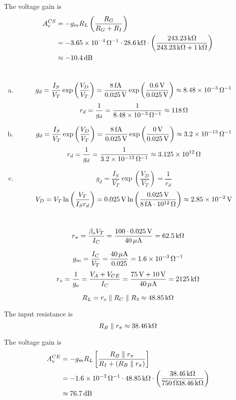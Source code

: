 \documentclass{article}
\newcommand{\unit}[1]{{\rm\,#1}}
\begin{document}
The voltage gain is
\begin{align*}
A_v^{CS}&=-g_mR_L\left(\frac{R_G}{R_G+R_I}\right)\\
&=-3.65\times10^{-4}\unit{\Omega^{-1}}\cdot28.6\unit{k\Omega}\cdot\left(\frac{243.23\unit{k\Omega}}{243.23\unit{k\Omega}+1\unit{k\Omega}}\right)\\
&\approx-10.4\unit{dB}
\end{align*}

\section{}
\begin{enumerate}[(a)]
\item $$g_d=\frac{I_S}{V_T}\exp\left(\frac{V_D}{V_T}\right)=\frac{8\unit{fA}}{0.025\unit{V}}\exp\left(\frac{0.6\unit{V}}{0.025\unit{V}}\right)\approx8.48\times10^{-3}\unit{\Omega^{-1}}$$
$$r_d=\frac{1}{g_d}=\frac{1}{8.48\times10^{-3}\unit{\Omega^{-1}}}\approx118\unit{\Omega}$$
\item $$g_d=\frac{I_S}{V_T}\exp\left(\frac{V_D}{V_T}\right)=\frac{8\unit{fA}}{0.025\unit{V}}\exp\left(\frac{0\unit{V}}{0.025\unit{V}}\right)\approx3.2\times10^{-13}\unit{\Omega^{-1}}$$
$$r_d=\frac{1}{g_d}=\frac{1}{3.2\times10^{-13}\unit{\Omega^{-1}}}\approx3.125\times10^{12}\unit{\Omega}$$
\item $$g_d=\frac{I_S}{V_T}\exp\left(\frac{V_D}{V_T}\right)=\frac{1}{r_d}$$
$$V_D=V_T\ln\left(\frac{V_T}{I_Sr_d}\right)=0.025\unit{V}\ln\left(\frac{0.025\unit{V}}{8\unit{fA}\cdot10^{12}\unit{\Omega}}\right)\approx2.85\times10^{-2}\unit{V}$$
\end{enumerate}

\section{}
$$r_\pi=\frac{\beta_oV_T}{I_C}=\frac{100\cdot0.025\unit{V}}{40\unit{\mu A}}=62.5\unit{k\Omega}$$

$$g_m=\frac{I_C}{V_T}=\frac{40\unit{\mu A}}{0.025}=1.6\times10^{-3}\unit{\Omega^{-1}}$$
$$r_o=\frac{1}{g_o}=\frac{V_A+V_{CE}}{I_C}=\frac{75\unit{V}+10\unit{V}}{40\unit{\mu A}}=2125\unit{k\Omega}$$

$$R_L=r_o\parallel R_C\parallel R_3\approx48.85\unit{k\Omega}$$

The input resistance is
$$R_B\parallel r_\pi\approx38.46\unit{k\Omega}$$

The voltage gain is
\begin{align*}
A_v^{CE}&=-g_mR_L\left[\frac{R_B\parallel r_\pi}{R_I+(R_B\parallel r_\pi)}\right]\\
&=-1.6\times10^{-3}\unit{\Omega^{-1}}\cdot48.85\unit{k\Omega}\cdot\left(\frac{38.46\unit{k\Omega}}{750\unit{\Omega}38.46\unit{k\Omega}}\right)\\
&\approx76.7\unit{dB}
\end{align*}
\end{document}
